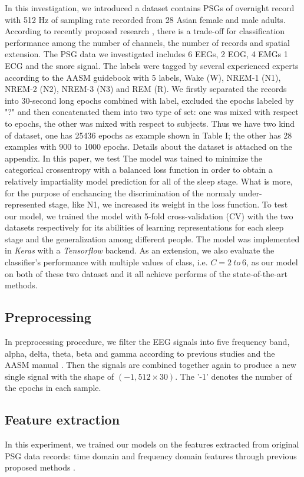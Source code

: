 \documentclass[journal]{IEEEtran}
\begin{document}
In this investigation, we introduced a dataset contains PSGs of overnight record with 512 Hz of sampling rate recorded from 28 Asian female and male adults. According to recently proposed research \cite{chambon2017deep}, there is a trade-off for classification performance among the number of channels, the number of records and spatial extension. The PSG data we investigated includes 6 EEGs, 2 EOG, 4 EMGs 1 ECG and the snore signal. The labels were tagged by several experienced experts according to the AASM guidebook with 5 labels, Wake (W), NREM-1 (N1), NREM-2 (N2), NREM-3 (N3) and REM (R). We firstly separated the records into 30-second long epochs combined with label, excluded the epochs labeled by "?" and then concatenated them into two type of set: one was mixed with respect to epochs, the other was mixed with respect to subjects. Thus we have two kind of dataset, one has 25436 epochs as example shown in Table I; the other has 28 examples with 900 to 1000 epochs. Details about the dataset is attached on the appendix. In this paper, we test The model was tained to minimize the categorical crossentropy with a balanced loss function in order to obtain a relatively impartiality model prediction for all of the sleep stage. What is more, for the purpose of enchancing the discrimination of the normaly under-represented stage, like N1, we increased its weight in the loss function. To test our model, we trained the model with 5-fold cross-validation (CV) with the two datasets respectively for its abilities of learning representations for each sleep stage and the generalization among different people. The model was implemented in \emph{Keras} with a \emph{Tensorflow} backend. As an extension, we also evaluate the classifier's performance with multiple values of class, i.e. $C = 2\ to\ 6$, as our model on both of these two dataset and it all achieve performs of the state-of-the-art methods.

\subsection{Preprocessing}
In preprocessing procedure, we filter the EEG signals into five frequency band, alpha, delta, theta, beta and gamma according to previous studies and the AASM manual \cite{ronzhina2012sleep,ebrahimi2008automatic,berry2012aasm}. Then the signals are combined together again to produce a new single signal with the shape of $(-1, 512\times30)$. The '-1' denotes the number of the epochs in each sample.
\subsection{Feature extraction}
In this experiment, we trained our models on the features extracted from original PSG data records: time domain and frequency domain features through previous proposed methods \cite{ronzhina2012sleep,ebrahimi2008automatic,chapotot2010automated}.
\end{document}
